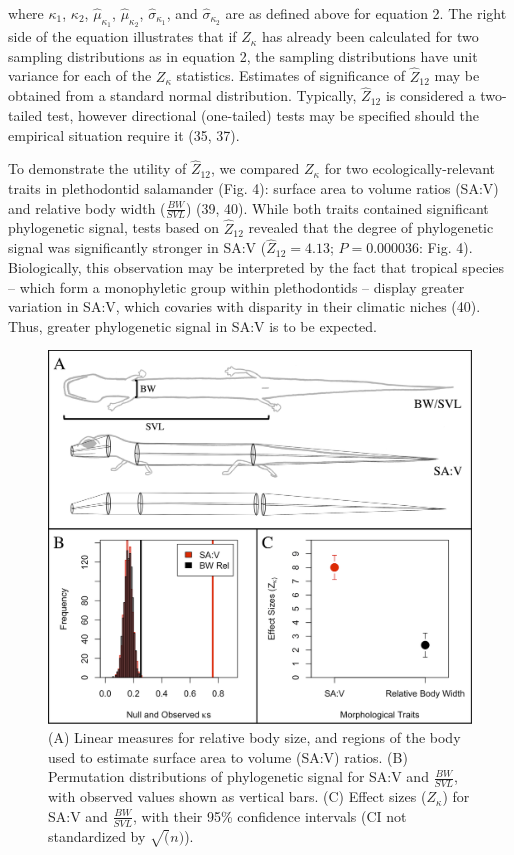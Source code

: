 \documentclass[9pt,twocolumn,twoside,lineno]{pnas-new}
\begin{document}
where \(\kappa_1\), \(\kappa_2\), \(\hat\mu_{\kappa_1}\),
\(\hat\mu_{\kappa_2}\), \(\hat\sigma_{\kappa_1}\), and
\(\hat\sigma_{\kappa_2}\) are as defined above for equation 2. The right
side of the equation illustrates that if \(Z_\kappa\) has already been
calculated for two sampling distributions as in equation 2, the sampling
distributions have unit variance for each of the \(Z_\kappa\)
statistics. Estimates of significance of \(\hat{Z}_{12}\) may be
obtained from a standard normal distribution. Typically,
\(\hat{Z}_{12}\) is considered a two-tailed test, however directional
(one-tailed) tests may be specified should the empirical situation
require it (35, 37).

To demonstrate the utility of \(\hat{Z}_12\), we compared \(Z_{\kappa}\)
for two ecologically-relevant traits in plethodontid salamander (Fig.
4): surface area to volume ratios (SA:V) and relative body width
(\(\frac{BW}{SVL}\)) (39, 40). While both traits contained significant
phylogenetic signal, tests based on \(\hat{Z}_{12}\) revealed that the
degree of phylogenetic signal was significantly stronger in SA:V
(\(\hat{Z}_{12}=4.13\); \(P=0.000036\): Fig. 4). Biologically, this
observation may be interpreted by the fact that tropical species --
which form a monophyletic group within plethodontids -- display greater
variation in SA:V, which covaries with disparity in their climatic
niches (40). Thus, greater phylogenetic signal in SA:V is to be
expected.

\begin{figure}
\centering
\includegraphics{new.fig.4.png}
\caption{(A) Linear measures for relative body size, and regions of the
body used to estimate surface area to volume (SA:V) ratios. (B)
Permutation distributions of phylogenetic signal for SA:V and
\(\frac{BW}{SVL}\), with observed values shown as vertical bars. (C)
Effect sizes (\(Z_\kappa\)) for SA:V and \(\frac{BW}{SVL}\), with their
95\% confidence intervals (CI not standardized by \(\sqrt(n)\)).{}}
\end{figure}
\end{document}
